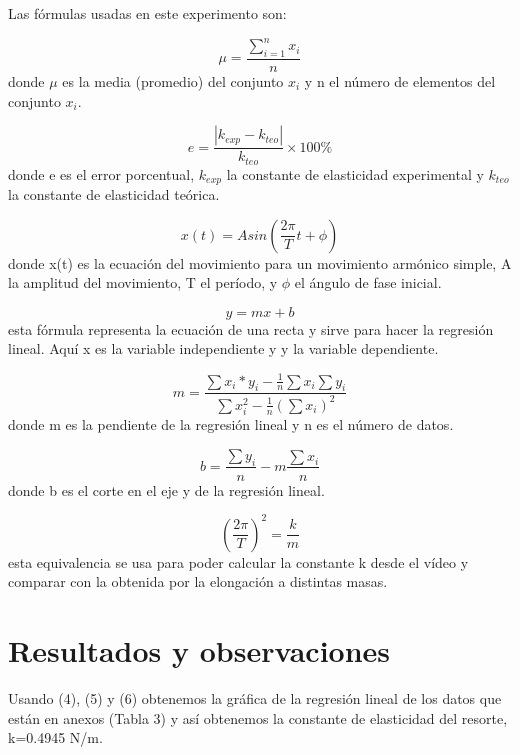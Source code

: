 \documentclass[a4paper]{article}
\begin{document}
Las fórmulas usadas en este experimento son:

\begin{equation}
    \mu= \frac{\displaystyle\sum_{i=1}^{n} x_i}{n}
\end{equation}
donde $\mu$ es la media (promedio) del conjunto $x_i$ y n el número de elementos del conjunto $x_i$.

\begin{equation}
    e=\frac{|k_{exp}-k_{teo}|}{k_{teo}}\times 100\%
\end{equation}
donde e es el error porcentual, $k_{exp}$ la constante de elasticidad experimental y $k_{teo}$ la constante de elasticidad teórica.

\begin{equation}
    x(t)=Asin(\frac{2\pi}{T} t + \phi)
\end{equation}
donde x(t) es la ecuación del movimiento para un movimiento armónico simple, A la amplitud del movimiento, T el período, y $\phi$ el ángulo de fase inicial.

\begin{equation}
    y=mx+b
\end{equation}
esta fórmula representa la ecuación de una recta y sirve para hacer la regresión lineal. Aquí x es la variable independiente y y la variable dependiente. 

\begin{equation}
   m=\frac{\sum x_i*y_i-\frac{1}{n}\sum x_i \sum y_i}{\sum x_i^2-\frac{1}{n}(\sum x_i)^2} 
\end{equation}
donde m es la pendiente de la regresión lineal y n es el número de datos.

\begin{equation}
    b=\frac{\sum y_i}{n}-m\frac{\sum x_i}{n}
\end{equation}
donde b es el corte en el eje y de la regresión lineal.

\begin{equation}
    (\frac{2 \pi}{T})^2=\frac{k}{m}
\end{equation}
esta equivalencia se usa para poder calcular la constante k desde el vídeo y comparar con la obtenida por la elongación a distintas masas.

\section{Resultados y observaciones}

Usando (4), (5) y (6) obtenemos la gráfica de la regresión lineal de los datos que están en anexos (Tabla 3) y así obtenemos la constante de elasticidad del resorte, k=0.4945 N/m.
\end{document}
